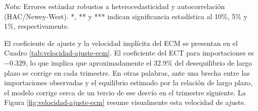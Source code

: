 \documentclass[11pt]{article}
\begin{document}
\begin{table}[H]
\centering
\caption{Coeficientes principales de los modelos econométricos finales.}
\label{tab:coeficientes-modelos-finales}
\small
{}
\vspace{1mm}

\begin{minipage}{0.96\textwidth}
\footnotesize \textit{Nota:} Errores estándar robustos a heterocedasticidad y autocorrelación (HAC/Newey-West). *, ** y *** indican significancia estadística al 10\%, 5\% y 1\%, respectivamente.
\end{minipage}
\end{table}

El coeficiente de ajuste y la velocidad implícita del ECM se presentan en el Cuadro
\ref{tab:velocidad-ajuste-ecm}. El coeficiente del ECT para importaciones es
\(-0.329\), lo que implica que aproximadamente el 32.9\% del desequilibrio de
largo plazo se corrige en cada trimestre. En otras palabras, ante una brecha
entre las importaciones observadas y el equilibrio estimado por la relación de
largo plazo, el modelo corrige cerca de un tercio de ese desvío en el trimestre
siguiente. La Figura \ref{fig:velocidad-ajuste-ecm} resume visualmente esta
velocidad de ajuste.
\end{document}
